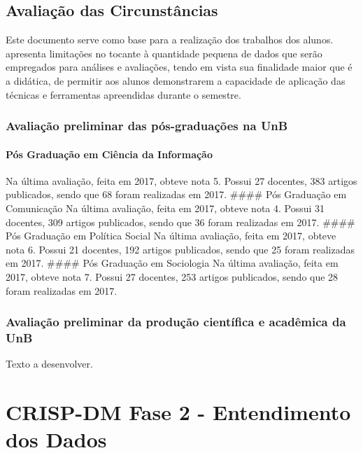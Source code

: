 \documentclass[]{article}
\let\oldparagraph\paragraph
\renewcommand{\paragraph}[1]{\oldparagraph{#1}\mbox{}}
\begin{document}
\subsection{Avaliação das
Circunstâncias}\label{avaliacao-das-circunstancias}

Este documento serve como base para a realização dos trabalhos dos
alunos. apresenta limitações no tocante à quantidade pequena de dados
que serão empregados para análises e avaliações, tendo em vista sua
finalidade maior que é a didática, de permitir aos alunos demonstrarem a
capacidade de aplicação das técnicas e ferramentas apreendidas durante o
semestre.

\subsubsection{Avaliação preliminar das pós-graduações na
UnB}\label{avaliacao-preliminar-das-pos-graduacoes-na-unb}

\paragraph{Pós Graduação em Ciência da
Informação}\label{pos-graduacao-em-ciencia-da-informacao}

Na última avaliação, feita em 2017, obteve nota 5. Possui 27 docentes,
383 artigos publicados, sendo que 68 foram realizadas em 2017. \#\#\#\#
Pós Graduação em Comunicação Na última avaliação, feita em 2017, obteve
nota 4. Possui 31 docentes, 309 artigos publicados, sendo que 36 foram
realizadas em 2017. \#\#\#\# Pós Graduação em Política Social Na última
avaliação, feita em 2017, obteve nota 6. Possui 21 docentes, 192 artigos
publicados, sendo que 25 foram realizadas em 2017. \#\#\#\# Pós
Graduação em Sociologia Na última avaliação, feita em 2017, obteve nota
7. Possui 27 docentes, 253 artigos publicados, sendo que 28 foram
realizadas em 2017.

\subsubsection{Avaliação preliminar da produção científica e acadêmica
da
UnB}\label{avaliacao-preliminar-da-producao-cientifica-e-academica-da-unb}

Texto a desenvolver.

\section{CRISP-DM Fase 2 - Entendimento dos
Dados}\label{crisp-dm-fase-2---entendimento-dos-dados}
\end{document}
